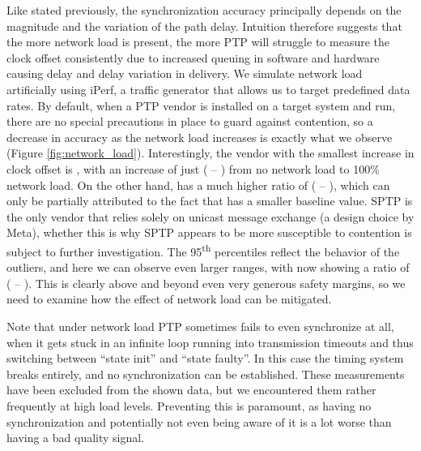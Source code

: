 Like stated previously, the synchronization accuracy principally depends on the magnitude and the variation of the path delay. Intuition therefore suggests that the more network load is present, the more PTP will struggle to measure the clock offset consistently due to increased queuing in software and hardware causing delay and delay variation in delivery. We simulate network load artificially using iPerf, a traffic generator that allows us to target predefined data rates. By default, when a PTP vendor is installed on a target system and run, there are no special precautions in place to guard against contention, so a decrease in accuracy as the network load increases is exactly what we observe (Figure \ref{fig:network_load}). Interestingly, the vendor with the smallest increase in clock offset is \fVendor{\cmpMinArg}, with an increase of just \fRatio[1]{\cmpMin} ( -- ) from no network load to 100\% network load. On the other hand, \fVendor{\cmpMaxArg} has a much higher ratio of \fRatio{\cmpMax} ( -- ), which can only be partially attributed to the fact that \fVendor{\cmpMaxArg} has a smaller baseline value.
%
SPTP is the only vendor that relies solely on unicast message exchange (a design choice by Meta), whether this is why SPTP appears to be more susceptible to contention is subject to further investigation.%
%
%
The 95\textsuperscript{th} percentiles reflect the behavior of the outliers, and here we can observe even larger ranges, with \fVendor{\cmpMaxArg} now showing a ratio of \fRatio[-1]{\cmpMax} ( -- ). This is clearly above and beyond even very generous safety margins, so we need to examine how the effect of network load can be mitigated.

 Note that under network load PTP sometimes fails to even synchronize at all, when it gets stuck in an infinite loop running into transmission timeouts and thus switching between ``state init'' and ``state faulty''. In this case the timing system breaks entirely, and no synchronization can be established. These measurements have been excluded from the shown data, but we encountered them rather frequently at high load levels. Preventing this is paramount, as having no synchronization and potentially not even being aware of it is a lot worse than having a bad quality signal.

